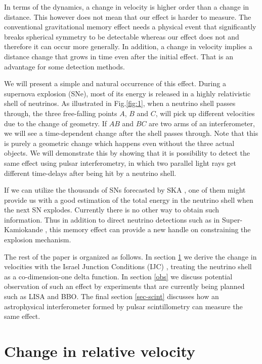 \documentclass[aps,showpacs,twocolumn,floats,prd,superscriptaddress,nofootinbib]{revtex4-1}
\begin{document}
In terms of the dynamics, a change in velocity is higher order than a change in distance. This however does not mean that our effect is harder to measure. The conventional gravitational memory effect needs a physical event that significantly breaks spherical symmetry to be detectable whereas our effect does not and therefore it can occur more generally. In addition, a change in velocity implies a distance change that grows in time even after the initial effect. That is an advantage for some detection methods.  

We will present a simple and natural occurrence of this effect. During a supernova explosion (SNe), most of its energy is released in a highly relativistic shell of neutrinos. As illustrated in Fig.\ref{fig:1}, when a neutrino shell passes through, the three free-falling points $A$, $B$ and $C$, will pick up different velocities due to the change of geometry. If $AB$ and $BC$ are two arms of an interferometer, we will see a time-dependent change after the shell passes through. Note that this is purely a geometric change which happens even without the three actual objects. We will demonstrate this by showing that it is possibility to detect the same effect using pulsar interferometry, in which two parallel light rays get different time-delays after being hit by a neutrino shell. 

If we can utilize the thousands of SNs forecasted by SKA \cite{MSPpopulation}, one of them might provide us with a good estimation of the total energy in the neutrino shell when the next SN explodes. Currently there is no other way to obtain such information. Thus in addition to direct neutrino detections such as in Super-Kamiokande \cite{SuperKSN}, this memory effect can provide a new handle on constraining the explosion mechanism. 

The rest of the paper is organized as follows. In section \ref{RelV} we derive the change in velocities with the Israel Junction Conditions (IJC) \cite{Isr66}, treating the neutrino shell as a co-dimension-one delta function. In section \ref{obs} we discuss potential observation of such an effect by experiments that are currently being planned such as LISA and BBO. The final section \ref{sec-scint} discusses how an astrophysical interferometer formed by pulsar scintillometry can measure the same effect.


\section{Change in relative velocity}
\label{RelV}
\end{document}
